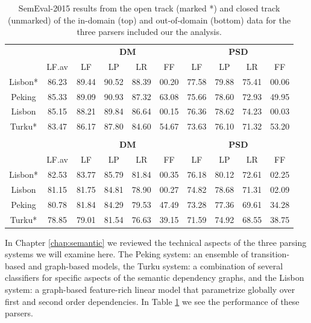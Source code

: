\begin{table}
    \centering
    \begin{tabular}{@{}cccccccccc@{}}
        \toprule
        \multicolumn{1}{c}{ }
        & \multicolumn{1}{c}{ }
        & \multicolumn{4}{c}{\textbf{DM}}
        & \multicolumn{4}{c}{\textbf{PSD}} \\
        \cmidrule(lr){3-6}
        \cmidrule(lr){7-10}
        &
        LF.av &
        LF & LP & LR & FF &
        LF & LP & LR & FF \\
        \midrule
        Lisbon* & 86.23 & 89.44 & 90.52 & 88.39 & 00.20 & 77.58 & 79.88 & 75.41 & 00.06 \\
        Peking & 85.33 & 89.09 & 90.93 & 87.32 & 63.08 & 75.66 & 78.60 & 72.93 & 49.95 \\
        Lisbon & 85.15 & 88.21 & 89.84 & 86.64 & 00.15 & 76.36 & 78.62 & 74.23 & 00.03 \\
        Turku* & 83.47 & 86.17 & 87.80 & 84.60 & 54.67 & 73.63 & 76.10 & 71.32 & 53.20 \\
        \bottomrule
        
        \\
        \toprule
        \multicolumn{1}{c}{ }
        & \multicolumn{1}{c}{ }
        & \multicolumn{4}{c}{\textbf{DM}}
        & \multicolumn{4}{c}{\textbf{PSD}} \\
        \cmidrule(lr){3-6}
        \cmidrule(lr){7-10}
        &
        LF.av &
        LF & LP & LR & FF &
        LF & LP & LR & FF \\
        \midrule
        Lisbon* & 82.53 & 83.77 & 85.79 & 81.84 & 00.35 & 76.18 & 80.12 & 72.61 & 02.25 \\
        Lisbon & 81.15 & 81.75 & 84.81 & 78.90 & 00.27 & 74.82 & 78.68 & 71.31 & 02.09 \\
        Peking & 80.78 & 81.84 & 84.29 & 79.53 & 47.49 & 73.28 & 77.36 & 69.61 & 34.28 \\
        Turku* & 78.85 & 79.01 & 81.54 & 76.63 & 39.15 & 71.59 & 74.92 & 68.55 & 38.75 \\
        \bottomrule
    \end{tabular}
    \caption{SemEval-2015 results from the open track (marked *) and closed track (unmarked) of the in-domain (top) and out-of-domain (bottom) data for the three parsers included our the analysis.}
    \label{fig:data:recap}
\end{table}

In Chapter \ref{chap:semantic} we reviewed the technical aspects of the three parsing systems we will examine here. The Peking system: an ensemble of transition-based and graph-based models, the Turku system: a combination of several classifiers for specific aspects of the semantic dependency graphs, and the Lisbon system: a graph-based feature-rich linear model that parametrize globally over first and second order dependencies. In Table \ref{fig:data:recap} we see the performance of these parsers. 


